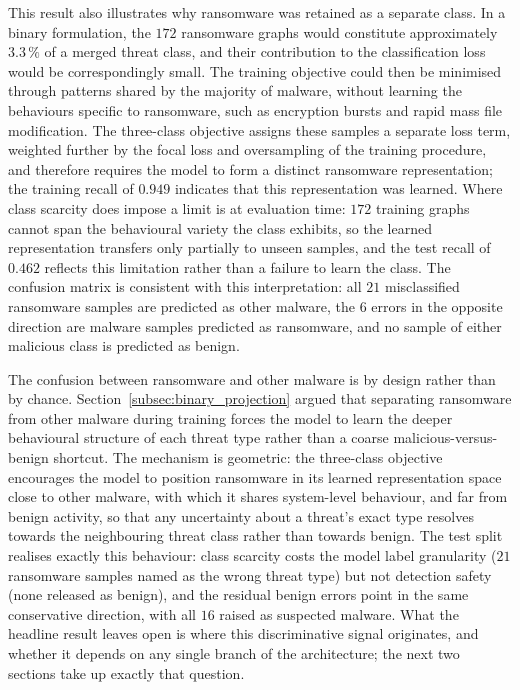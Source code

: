 \documentclass[%
    BCOR=10mm,
    DIV=13,
    toc=bibliography,
    toc=listof,
    oneside,
    12pt,
]{scrbook}
\begin{document}
This result also illustrates why ransomware was retained as a separate class.
In a binary formulation, the $172$ ransomware graphs would constitute
approximately $3.3\,\%$ of a merged threat class, and their contribution to the
classification loss would be correspondingly small. The training objective
could then be minimised through patterns shared by the majority of malware,
without learning the behaviours specific to ransomware, such as encryption
bursts and rapid mass file modification. The three-class objective assigns
these samples a separate loss term, weighted further by the focal loss and
oversampling of the training procedure, and therefore requires the model to
form a distinct ransomware representation; the training recall of $0.949$
indicates that this representation was learned. Where class scarcity does
impose a limit is at evaluation time: $172$ training graphs cannot span the
behavioural variety the class exhibits, so the learned representation
transfers only partially to unseen samples, and the test recall of $0.462$
reflects this limitation rather than a failure to learn the class.
The confusion matrix is consistent with this interpretation: all $21$
misclassified ransomware samples are predicted as other malware, the $6$ errors
in the opposite direction are malware samples predicted as ransomware, and no
sample of either malicious class is predicted as benign.

The confusion between ransomware and other malware is by design rather than by
chance. Section~\ref{subsec:binary_projection} argued that
separating ransomware from other malware during training forces the model to
learn the deeper behavioural structure of each threat type rather than a
coarse malicious-versus-benign shortcut. The mechanism is geometric: the
three-class objective encourages the model to position ransomware in its learned
representation space close to other malware, with which it shares system-level
behaviour, and far from benign activity, so that any uncertainty about a
threat's exact type resolves towards the neighbouring threat class rather
than towards benign. The test split realises exactly this behaviour: class
scarcity costs the model label granularity ($21$ ransomware samples named as
the wrong threat type) but not detection safety (none released as benign), and
the residual benign errors point in the same conservative direction, with all
$16$ raised as suspected malware. What the headline result leaves open is where
this discriminative signal originates, and whether it depends on any single
branch of the architecture; the next two sections take up exactly that
question.
\end{document}

